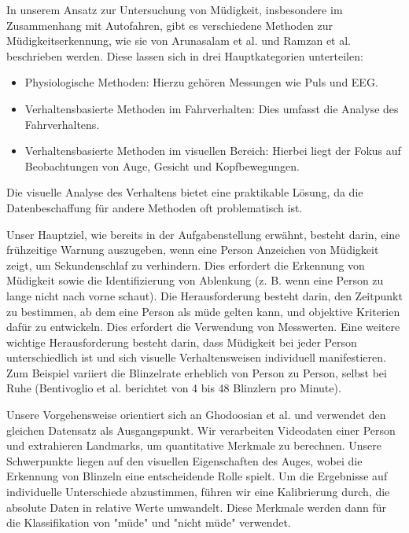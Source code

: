 In unserem Ansatz zur Untersuchung von Müdigkeit, insbesondere im Zusammenhang mit Autofahren, gibt es verschiedene Methoden zur Müdigkeitserkennung, wie sie von Arunasalam et al. \cite{AR20} und Ramzan et al. \cite{RA19} beschrieben werden. Diese lassen sich in drei Hauptkategorien unterteilen:

\begin{itemize}
\item Physiologische Methoden: Hierzu gehören Messungen wie Puls und EEG.
\item Verhaltensbasierte Methoden im Fahrverhalten: Dies umfasst die Analyse des Fahrverhaltens.
\item Verhaltensbasierte Methoden im visuellen Bereich: Hierbei liegt der Fokus auf Beobachtungen von Auge, Gesicht und Kopfbewegungen.
\end{itemize}

Die visuelle Analyse des Verhaltens bietet eine praktikable Lösung, da die Datenbeschaffung für andere Methoden oft problematisch ist.

Unser Hauptziel, wie bereits in der Aufgabenstellung erwähnt, besteht darin, eine frühzeitige Warnung auszugeben, wenn eine Person Anzeichen von Müdigkeit zeigt, um Sekundenschlaf zu verhindern. Dies erfordert die Erkennung von Müdigkeit sowie die Identifizierung von Ablenkung (z. B. wenn eine Person zu lange nicht nach vorne schaut). Die Herausforderung besteht darin, den Zeitpunkt zu bestimmen, ab dem eine Person als müde gelten kann, und objektive Kriterien dafür zu entwickeln. Dies erfordert die Verwendung von Messwerten. Eine weitere wichtige Herausforderung besteht darin, dass Müdigkeit bei jeder Person unterschiedlich ist und sich visuelle Verhaltensweisen individuell manifestieren. Zum Beispiel variiert die Blinzelrate erheblich von Person zu Person, selbst bei Ruhe (Bentivoglio et al. \cite{BE97} berichtet von 4 bis 48 Blinzlern pro Minute).

Unsere Vorgehensweise orientiert sich an Ghodoosian et al. \cite{GH19} und verwendet den gleichen Datensatz als Ausgangspunkt. Wir verarbeiten Videodaten einer Person und extrahieren Landmarks, um quantitative Merkmale zu berechnen. Unsere Schwerpunkte liegen auf den visuellen Eigenschaften des Auges, wobei die Erkennung von Blinzeln eine entscheidende Rolle spielt. Um die Ergebnisse auf individuelle Unterschiede abzustimmen, führen wir eine Kalibrierung durch, die absolute Daten in relative Werte umwandelt. Diese Merkmale werden dann für die Klassifikation von "müde" und "nicht müde" verwendet.

